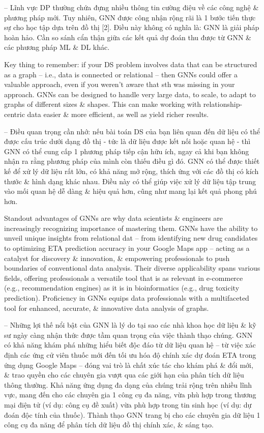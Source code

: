 \documentclass{article}
\begin{document}
\begin{itemize}
    -- Lĩnh vực DP thường chứa đựng nhiều thông tin cường điệu về các công nghệ \& phương pháp mới. Tuy nhiên, GNN được công nhận rộng rãi là 1 bước tiến thực sự cho học tập dựa trên đồ thị [2]. Điều này không có nghĩa là: GNN là giải pháp hoàn hảo. Cần so sánh cẩn thận giữa các kết quả dự đoán thu được từ GNN \& các phương pháp ML \& DL khác.

    Key thing to remember: if your DS problem involves data that can be structured as a graph -- i.e., data is connected or relational -- then GNNs could offer a valuable approach, even if you weren't aware that sth was missing in your approach. GNNs can be designed to handle very large data, to scale, to adapt to graphs of different sizes \& shapes. This can make working with relationship-centric data easier \& more efficient, as well as yield richer results.

    -- Điều quan trọng cần nhớ: nếu bài toán DS của bạn liên quan đến dữ liệu có thể được cấu trúc dưới dạng đồ thị - tức là dữ liệu được kết nối hoặc quan hệ - thì GNN có thể cung cấp 1 phương pháp tiếp cận hữu ích, ngay cả khi bạn không nhận ra rằng phương pháp của mình còn thiếu điều gì đó. GNN có thể được thiết kế để xử lý dữ liệu rất lớn, có khả năng mở rộng, thích ứng với các đồ thị có kích thước \& hình dạng khác nhau. Điều này có thể giúp việc xử lý dữ liệu tập trung vào mối quan hệ dễ dàng \& hiệu quả hơn, cũng như mang lại kết quả phong phú hơn.

    Standout advantages of GNNs are why data scientists \& engineers are increasingly recognizing importance of mastering them. GNNs have the ability to unveil unique insights from relational dat -- from identifying new drug candidates to optimizing ETA prediction accuracy in your Google Maps app -- acting as a catalyst for discovery \& innovation, \& empowering professionals to push boundaries of conventional data analysis. Their diverse applicability spans various fields, offering professionals a versatile tool that is as relevant in e-commerce (e.g., recommendation engines) as it is in bioinformatics (e.g., drug toxicity prediction). Proficiency in GNNs equips data professionals with a multifaceted tool for enhanced, accurate, \& innovative data analysis of graphs.

    -- Những lợi thế nổi bật của GNN là lý do tại sao các nhà khoa học dữ liệu \& kỹ sư ngày càng nhận thức được tầm quan trọng của việc thành thạo chúng. GNN có khả năng khám phá những hiểu biết độc đáo từ dữ liệu quan hệ -- từ việc xác định các ứng cử viên thuốc mới đến tối ưu hóa độ chính xác dự đoán ETA trong ứng dụng Google Maps -- đóng vai trò là chất xúc tác cho khám phá \& đổi mới, \& trao quyền cho các chuyên gia vượt qua các giới hạn của phân tích dữ liệu thông thường. Khả năng ứng dụng đa dạng của chúng trải rộng trên nhiều lĩnh vực, mang đến cho các chuyên gia 1 công cụ đa năng, vừa phù hợp trong thương mại điện tử (ví dụ: công cụ đề xuất) vừa phù hợp trong tin sinh học (ví dụ: dự đoán độc tính của thuốc). Thành thạo GNN trang bị cho các chuyên gia dữ liệu 1 công cụ đa năng để phân tích dữ liệu đồ thị chính xác, \& sáng tạo.


\end{itemize}
\end{document}
